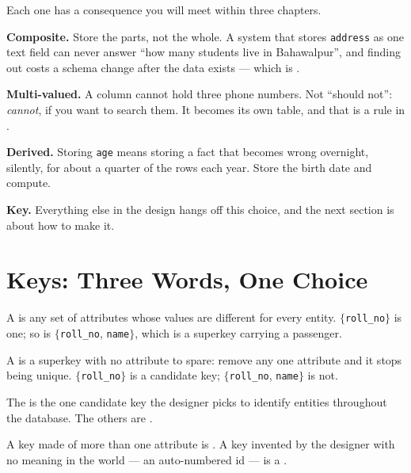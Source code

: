 \begin{conceptbox}
Each one has a consequence you will meet within three chapters.

\begin{tight}
  \item \textbf{Composite.} Store the parts, not the whole. A system that
        stores \texttt{address} as one text field can never answer ``how many
        students live in Bahawalpur'', and finding out costs a schema change
        after the data exists --- which is .
  \item \textbf{Multi-valued.} A column cannot hold three phone numbers. Not
        ``should not'': \emph{cannot}, if you want to search them. It becomes
        its own table, and that is a rule in .
  \item \textbf{Derived.} Storing \texttt{age} means storing a fact that
        becomes wrong overnight, silently, for about a quarter of the rows
        each year. Store the birth date and compute.
  \item \textbf{Key.} Everything else in the design hangs off this choice, and
        the next section is about how to make it.
\end{tight}
\end{conceptbox}

\section{Keys: Three Words, One Choice}

\begin{definitionbox}
A  is any set of attributes whose values are different for
every entity. $\{$\texttt{roll\_no}$\}$ is one; so is
$\{$\texttt{roll\_no}, \texttt{name}$\}$, which is a superkey carrying a
passenger.

\smallskip
A  is a superkey with no attribute to spare: remove any one
attribute and it stops being unique. $\{$\texttt{roll\_no}$\}$ is a candidate
key; $\{$\texttt{roll\_no}, \texttt{name}$\}$ is not.

\smallskip
The  is the one candidate key the designer picks to identify
entities throughout the database. The others are .

\smallskip
A key made of more than one attribute is . A key invented by
the designer with no meaning in the world --- an auto-numbered id --- is a
.
\end{definitionbox}

